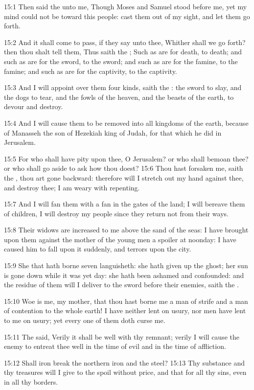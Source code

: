 15:1 Then said the \LORD unto me, Though Moses and Samuel stood before
me, yet my mind could not be toward this people: cast them out of my
sight, and let them go forth.

15:2 And it shall come to pass, if they say unto thee, Whither shall
we go forth? then thou shalt tell them, Thus saith the \LORD; Such as
are for death, to death; and such as are for the sword, to the sword;
and such as are for the famine, to the famine; and such as are for the
captivity, to the captivity.

15:3 And I will appoint over them four kinds, saith the \LORD: the
sword to slay, and the dogs to tear, and the fowls of the heaven, and
the beasts of the earth, to devour and destroy.

15:4 And I will cause them to be removed into all kingdoms of the
earth, because of Manasseh the son of Hezekiah king of Judah, for that
which he did in Jerusalem.

15:5 For who shall have pity upon thee, O Jerusalem? or who shall
bemoan thee? or who shall go aside to ask how thou doest?  15:6 Thou
hast forsaken me, saith the \LORD, thou art gone backward: therefore
will I stretch out my hand against thee, and destroy thee; I am weary
with repenting.

15:7 And I will fan them with a fan in the gates of the land; I will
bereave them of children, I will destroy my people since they return
not from their ways.

15:8 Their widows are increased to me above the sand of the seas: I
have brought upon them against the mother of the young men a spoiler
at noonday: I have caused him to fall upon it suddenly, and terrors
upon the city.

15:9 She that hath borne seven languisheth: she hath given up the
ghost; her sun is gone down while it was yet day: she hath been
ashamed and confounded: and the residue of them will I deliver to the
sword before their enemies, saith the \LORD.

15:10 Woe is me, my mother, that thou hast borne me a man of strife
and a man of contention to the whole earth! I have neither lent on
usury, nor men have lent to me on usury; yet every one of them doth
curse me.

15:11 The \LORD said, Verily it shall be well with thy remnant; verily
I will cause the enemy to entreat thee well in the time of evil and in
the time of affliction.

15:12 Shall iron break the northern iron and the steel?  15:13 Thy
substance and thy treasures will I give to the spoil without price,
and that for all thy sins, even in all thy borders.

